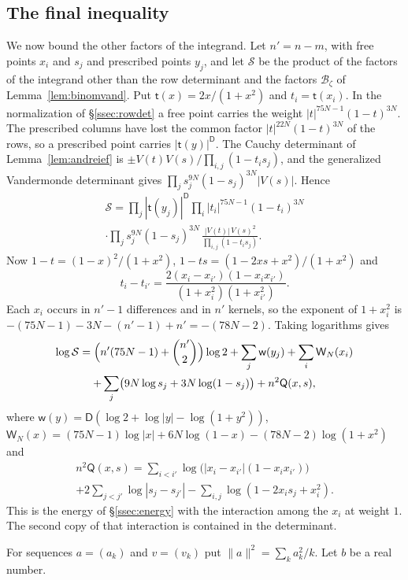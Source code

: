 \subsection{The final inequality}\label{ssec:budget}
We now bound the other factors of the integrand. Let $n'=n-m$, with free points $x_i$ and $s_j$ and prescribed points $y_j$, and let $\mathcal S$ be the product of the
factors of the integrand other than the row determinant and the factors $\mathcal B_\zeta$ of Lemma~\ref{lem:binomvand}. Put $\mathsf t(x)=2x/(1+x^2)$ and $t_i=\mathsf t(x_i)$. In the normalization of
\S\ref{ssec:rowdet} a free point carries the weight $|t|^{75N-1}(1-t)^{3N}$. The prescribed columns have lost the common factor $|t|^{22N}(1-t)^{3N}$ of the rows, so a prescribed point
carries $|\mathsf t(y)|^{\mathsf D}$. The Cauchy determinant of Lemma~\ref{lem:andreief} is $\pm V(t)V(s)/\prod_{i,j}(1-t_is_j)$, and the generalized Vandermonde determinant gives
$\prod_js_j^{9N}(1-s_j)^{3N}|V(s)|$. Hence
\begin{multline*}
 \mathcal S=\prod_j|\mathsf t(y_j)|^{\mathsf D}\prod_i|t_i|^{75N-1}(1-t_i)^{3N}\\
 \cdot\prod_js_j^{9N}(1-s_j)^{3N}\,\frac{|V(t)|\,V(s)^2}{\prod_{i,j}(1-t_is_j)}.
\end{multline*}
Now $1-t=(1-x)^2/(1+x^2)$, $1-ts=(1-2xs+x^2)/(1+x^2)$ and
\[
 t_i-t_{i'}=\frac{2(x_i-x_{i'})(1-x_ix_{i'})}{(1+x_i^2)(1+x_{i'}^2)}.
\]
Each $x_i$ occurs in $n'-1$ differences and in $n'$ kernels, so the exponent of $1+x_i^2$ is $-(75N-1)-3N-(n'-1)+n'=-(78N-2)$. Taking logarithms gives
\begin{multline}\label{eq:scalar}
 \log\mathcal S=\Bigl(n'(75N-1)+\binom{n'}2\Bigr)\log2+\sum_j\mathsf w(y_j)+\sum_i\mathsf W_N(x_i)\\
 +\sum_j\bigl(9N\log s_j+3N\log(1-s_j)\bigr)+n^2\mathsf Q(x,s),
\end{multline}
where $\mathsf w(y)=\mathsf D(\log2+\log|y|-\log(1+y^2))$, $\mathsf W_N(x)=(75N-1)\log|x|+6N\log(1-x)-(78N-2)\log(1+x^2)$ and
\begin{multline*}
 n^2\mathsf Q(x,s)=\sum_{i<i'}\log\bigl(|x_i-x_{i'}|(1-x_ix_{i'})\bigr)\\
 +2\sum_{j<j'}\log|s_j-s_{j'}|-\sum_{i,j}\log(1-2x_is_j+x_i^2).
\end{multline*}
This is the energy of \S\ref{ssec:energy} with the interaction among the $x_i$ at weight $1$. The second copy of that interaction is
contained in the determinant.

For sequences $a=(a_k)$ and $v=(v_k)$ put $\|a\|^2=\sum_ka_k^2/k$. Let $b$ be a real number.

